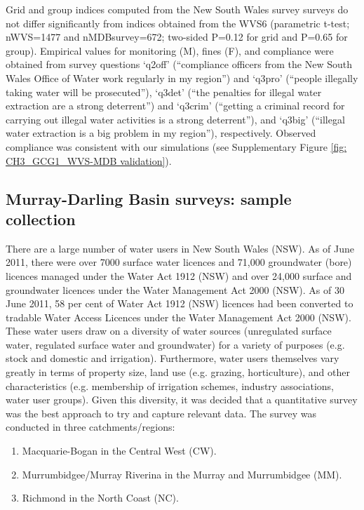 \documentclass[12pt, a4paper]{article}
\begin{document}
Grid and group indices computed from the New South Wales survey surveys do not differ significantly from indices obtained from the WVS6 (parametric t-test; nWVS=1477 and nMDBsurvey=672; two-sided P=0.12 for grid and P=0.65 for group). Empirical values for monitoring (M), fines (F), and compliance were obtained from survey questions ‘q2off’ (“compliance officers from the New South Wales Office of Water work regularly in my region”) and ‘q3pro’ (“people illegally taking water will be prosecuted”), ‘q3det’ (“the penalties for illegal water extraction are a strong deterrent”) and ‘q3crim’ (“getting a criminal record for carrying out illegal water activities is a strong deterrent”), and ‘q3big’ (“illegal water extraction is a big problem in my region”), respectively. Observed compliance was consistent with our simulations (see Supplementary Figure \ref{fig: CH3_GCG1_WVS-MDB validation}).

\subsection{Murray-Darling Basin surveys: sample collection}

There are a large number of water users in New South Wales (NSW). As of June 2011, there were over 7000 surface water licences and 71,000 groundwater (bore) licences managed under the Water Act 1912 (NSW) and over 24,000 surface and groundwater licences under the Water Management Act 2000 (NSW).  As of 30 June 2011, 58 per cent of Water Act 1912 (NSW) licences had been converted to tradable Water Access Licences under the Water Management Act 2000 (NSW). These water users draw on a diversity of water sources (unregulated surface water, regulated surface water and groundwater) for a variety of purposes (e.g. stock and domestic and irrigation). Furthermore, water users themselves vary greatly in terms of property size, land use (e.g. grazing, horticulture), and other characteristics (e.g. membership of irrigation schemes, industry associations, water user groups). Given this diversity, it was decided that a quantitative survey was the best approach to try and capture relevant data. The survey was conducted in three catchments/regions:

\begin{enumerate}
	\item Macquarie-Bogan in the Central West (CW).
	\item Murrumbidgee/Murray Riverina in the Murray and Murrumbidgee (MM).
	\item Richmond in the North Coast (NC). 
\end{enumerate}
\end{document}
